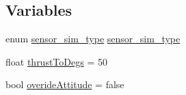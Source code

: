 \subsection*{\-Variables}
\begin{DoxyCompactItemize}
\item 
enum \hyperlink{group___sensors_ga6423b17c1c5cfe30ec2b9cabedc03f70}{sensor\-\_\-sim\-\_\-type} \hyperlink{group___sensors_gaa5e76bc9bc1cc20d2b183069aea687b4}{sensor\-\_\-sim\-\_\-type}
\item 
float \hyperlink{group___sensors_ga0bfc1acfbf1c0b59ebaeba678cb8c811}{thrust\-To\-Degs} = 50
\item 
bool \hyperlink{group___sensors_ga4003f7985e24e407bbc2f44b2d289c29}{overide\-Attitude} = false
\end{DoxyCompactItemize}


